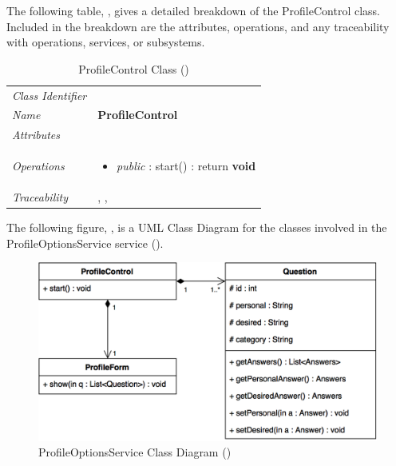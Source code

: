 \documentclass[12pt,letterpaper]{article}
\begin{document}
The following table, , gives a detailed breakdown of the ProfileControl class. Included in the breakdown are the attributes, operations, and any traceability with operations, services, or subsystems.

\begin{table}[H]
    \caption{ProfileControl Class ()} 
	\begin{tabu} to 
		\toprule
		Class Identifier &  \\
		Name & {\bf ProfileControl} \\
		Attributes & \\

		Operations &
		\begin{minipage}[t]{\linewidth}
			\begin{itemize}
			    \item {\it public} : start() : return {\bf void}
	        \end{itemize}
	    \end{minipage} \\
	    	Traceability & , , \\
		\toprule
	\end{tabu}
\end{table}

The following figure, , is a UML Class Diagram for the classes involved in the ProfileOptionsService service ().

\begin{figure}[H]
	\centering{}
	\includegraphics[scale=0.33]{imgs/d3/interfaces/profile-options.png}
	\caption{ProfileOptionsService Class Diagram ()}
\end{figure}
\end{document}
